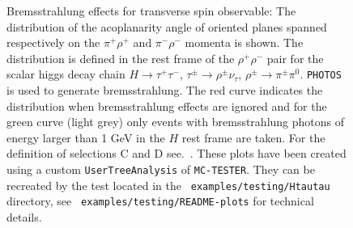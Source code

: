 \documentclass[]{Photos_interface_design}
\begin{document}
\begin{figure}[h!]
\centering
{}
\caption{Bremsstrahlung effects for transverse spin observable: 
  The distribution of the acoplanarity angle of oriented planes spanned respectively on 
  the $\pi^+\rho^+$ and $\pi^-\rho^-$ momenta is shown.  
The distribution is defined in the rest frame of the
  $\rho^+ \rho^-$ pair for the scalar higgs decay chain $H\to
  \tau^+\tau^-$, $\tau^\pm \to \rho^\pm \nu_\tau$, $\rho^\pm \to
  \pi^\pm \pi^0$. {\tt PHOTOS} is used to generate
  bremsstrahlung.  The red curve indicates the distribution when
  bremsstrahlung effects are ignored and for the green curve (light grey) 
only events
  with bremsstrahlung  photons of energy larger than 1 GeV
  in the $H$ rest frame are taken. For the definition of selections C
  and D see.~\cite{Bower:2002zx,Desch:2003rw}.  These plots have been created using
  a custom {\tt UserTreeAnalysis} of {\tt MC-TESTER}.  They can be
  recreated by  the test located in the {\tt
    examples/testing/Htautau} directory, see {\tt
    examples/testing/README-plots} for technical details.
\label{fig:acoplanarity}
}
\end{figure}
\end{document}
